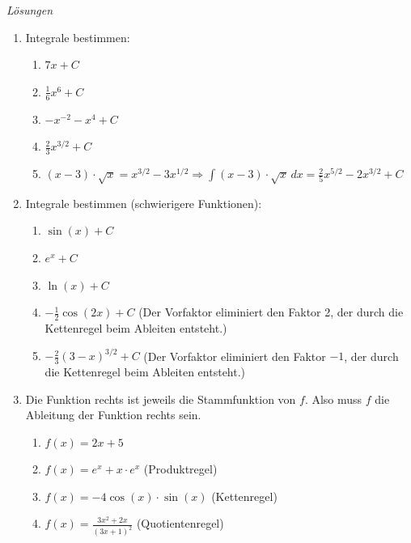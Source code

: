 \emph{Lösungen}
\begin{enumerate}
	\item  Integrale bestimmen:
	      \begin{enumerate}
		      \item $7x + C$
		      \item $\frac{1}{6} x^6 + C$
		      \item $-x^{-2} - x^4 + C$
		      \item $\frac{2}{3} x^{3/2} + C$
		      \item $ (x-3) \cdot \sqrt{x} = x^{3/2} - 3x^{1/2} \Rightarrow \int (x-3) \cdot \sqrt{x} \, dx = \frac{2}{5} x^{5/2} - 2 x^{3/2} + C$
	      \end{enumerate}
	\item Integrale bestimmen (schwierigere Funktionen):
	      \begin{enumerate}
		      \item $\sin(x) + C$
		      \item $e^x + C$
		      \item $\ln(x) + C$
		      \item $-\frac{1}{2} \cos(2x) + C$ (Der Vorfaktor eliminiert den Faktor 2, der durch die Kettenregel beim Ableiten entsteht.)
		      \item $-\frac{2}{3} (3-x)^{3/2} + C$ (Der Vorfaktor eliminiert den Faktor $-1$, der durch die Kettenregel beim Ableiten entsteht.)
	      \end{enumerate}
	\item Die Funktion rechts ist jeweils die Stammfunktion von $f$. Also muss $f$ die Ableitung der Funktion rechts sein.
	      \begin{enumerate}
		      \item $f(x) = 2x + 5$
		      \item $f(x) = e^x + x \cdot e^x$ (Produktregel)
		      \item $f(x) = -4 \cos(x) \cdot \sin(x)$ (Kettenregel)
		      \item $f(x) = \frac{3x^2+2x}{(3x+1)^2}$ (Quotientenregel)
	      \end{enumerate}
\end{enumerate}